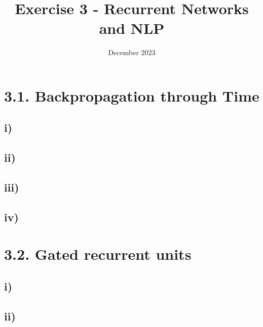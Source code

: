 

\title{Exercise 3 - Recurrent Networks and NLP}
\date{December 2023}



\maketitle
\section*{3.1. Backpropagation through Time}
\subsection*{i)}

\subsection*{ii)}

\subsection*{iii)}


\subsection*{iv)}


\section*{3.2. Gated recurrent units}
\subsection*{i)}

\subsection*{ii)}


